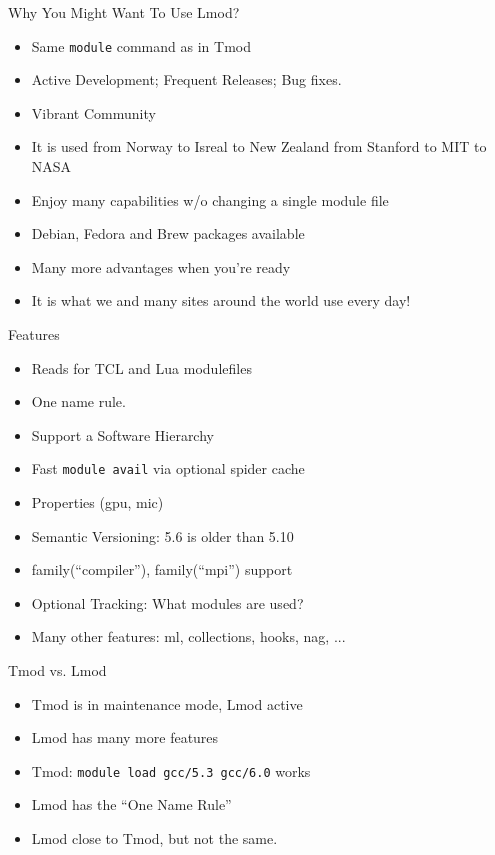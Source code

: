 \documentclass[dvipsnames,aspectratio=169]{beamer}
\begin{document}
\begin{frame}{Why You Might Want To Use Lmod?}
  \begin{itemize}
    \item Same \texttt{module} command as in Tmod
    \item Active Development;  Frequent Releases; Bug fixes.
    \item Vibrant Community
    \item It is used from Norway to Isreal to New Zealand from Stanford to MIT to NASA
    \item Enjoy many capabilities w/o changing a single module file
    \item Debian, Fedora and Brew packages available
    \item Many more advantages when you're ready
    \item It is what we and many sites around the world use every day!
  \end{itemize}
\end{frame}

\begin{frame}{Features}
  \begin{itemize}
    \item Reads for TCL and Lua modulefiles
    \item One name rule.
    \item Support a Software Hierarchy
    \item Fast \texttt{module avail} via optional spider cache 
    \item Properties (gpu, mic)
    \item Semantic Versioning:  5.6 is older than 5.10
    \item family(``compiler''), family(``mpi'') support
    \item Optional Tracking: What modules are used?
    \item Many other features: ml, collections, hooks, nag, ...
  \end{itemize}
\end{frame}

\begin{frame}{Tmod vs. Lmod}
  \begin{itemize}
    \item Tmod is in maintenance mode, Lmod active
    \item Lmod has many more features
    \item Tmod: \texttt{module load gcc/5.3 gcc/6.0} works
    \item Lmod has the ``One Name Rule''
    \item Lmod close to Tmod, but not the same.
  \end{itemize}
\end{frame}
\end{document}
